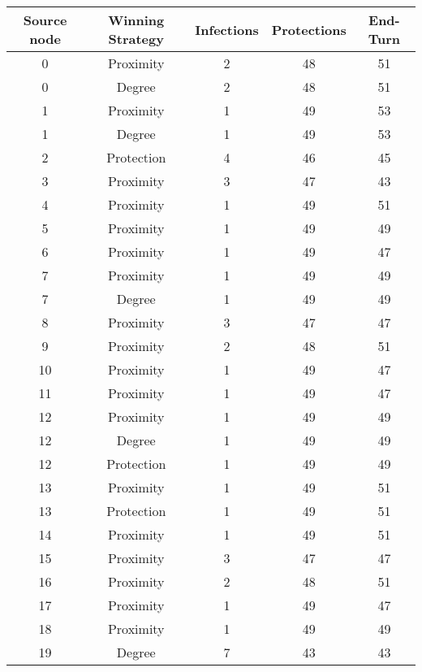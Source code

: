 \documentclass[results.tex]{subfiles}
\begin{document}
\begin{center}
  \begin{tabular}{| c || c | c | c | c |}
    \hline
    {\bfseries Source node} & {\bfseries Winning Strategy} & {\bfseries Infections} & {\bfseries Protections} & {\bfseries End-Turn} \\  %
    \hline\hline
    0 & Proximity & 2 & 48 & 51 \\ 
    \hline
    0 & Degree & 2 & 48 & 51 \\ 
    \hline
    1 & Proximity & 1 & 49 & 53 \\ 
    \hline
    1 & Degree & 1 & 49 & 53 \\ 
    \hline
    2 & Protection & 4 & 46 & 45 \\ 
    \hline
    3 & Proximity & 3 & 47 & 43 \\ 
    \hline
    4 & Proximity & 1 & 49 & 51 \\ 
    \hline
    5 & Proximity & 1 & 49 & 49 \\ 
    \hline
    6 & Proximity & 1 & 49 & 47 \\ 
    \hline
    7 & Proximity & 1 & 49 & 49 \\ 
    \hline
    7 & Degree & 1 & 49 & 49 \\ 
    \hline
    8 & Proximity & 3 & 47 & 47 \\ 
    \hline
    9 & Proximity & 2 & 48 & 51 \\ 
    \hline
    10 & Proximity & 1 & 49 & 47 \\ 
    \hline
    11 & Proximity & 1 & 49 & 47 \\ 
    \hline
    12 & Proximity & 1 & 49 & 49 \\ 
    \hline
    12 & Degree & 1 & 49 & 49 \\ 
    \hline
    12 & Protection & 1 & 49 & 49 \\ 
    \hline
    13 & Proximity & 1 & 49 & 51 \\ 
    \hline
    13 & Protection & 1 & 49 & 51 \\ 
    \hline
    14 & Proximity & 1 & 49 & 51 \\ 
    \hline
    15 & Proximity & 3 & 47 & 47 \\ 
    \hline
    16 & Proximity & 2 & 48 & 51 \\ 
    \hline
    17 & Proximity & 1 & 49 & 47 \\ 
    \hline
    18 & Proximity & 1 & 49 & 49 \\ 
    \hline
    19 & Degree & 7 & 43 & 43 \\ 

\end{tabular}
\end{center}
\end{document}

